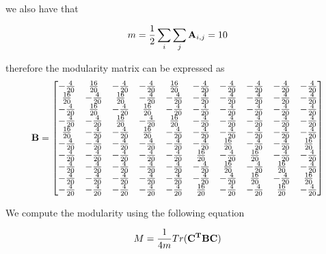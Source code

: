 \documentclass[a4paper,12pt]{article}
\begin{document}
	we also have that 
	
	\[ m = \frac{1}{2} \sum_i \sum_j {\bf A}_{i,j} = 10\]
	
	therefore the modularity matrix can be expressed as 
	\[ {\bf B} = \begin{bmatrix}
		-\frac{4}{20}& \frac{16}{20}& -\frac{4}{20}& -\frac{4}{20}& \frac{16}{20}& -\frac{4}{20}& -\frac{4}{20}& -\frac{4}{20}& -\frac{4}{20}& -\frac{4}{20}\\
		\frac{16}{20}& -\frac{4}{20}& \frac{16}{20}& -\frac{4}{20}& -\frac{4}{20}& -\frac{4}{20}& -\frac{4}{20}& -\frac{4}{20}& -\frac{4}{20}& -\frac{4}{20}\\
		-\frac{4}{20}& \frac{16}{20}& -\frac{4}{20}& \frac{16}{20}& -\frac{4}{20}& -\frac{4}{20}& -\frac{4}{20}& -\frac{4}{20}& -\frac{4}{20}& -\frac{4}{20}\\
		-\frac{4}{20}& -\frac{4}{20}& \frac{16}{20}& -\frac{4}{20}& \frac{16}{20}& -\frac{4}{20}& -\frac{4}{20}& -\frac{4}{20}& -\frac{4}{20}& -\frac{4}{20}\\
		\frac{16}{20}& -\frac{4}{20}& -\frac{4}{20}& \frac{16}{20}& -\frac{4}{20}& -\frac{4}{20}& -\frac{4}{20}& -\frac{4}{20}& -\frac{4}{20}& -\frac{4}{20}\\
		-\frac{4}{20}& -\frac{4}{20}& -\frac{4}{20}& -\frac{4}{20}& -\frac{4}{20}& -\frac{4}{20}& \frac{16}{20}& -\frac{4}{20}& -\frac{4}{20}& \frac{16}{20}\\
		-\frac{4}{20}& -\frac{4}{20}& -\frac{4}{20}& -\frac{4}{20}& -\frac{4}{20}& \frac{16}{20}& -\frac{4}{20}& \frac{16}{20}& -\frac{4}{20}& -\frac{4}{20}\\
		-\frac{4}{20}& -\frac{4}{20}& -\frac{4}{20}& -\frac{4}{20}& -\frac{4}{20}& -\frac{4}{20}& \frac{16}{20}& -\frac{4}{20}& \frac{16}{20}& -\frac{4}{20}\\
		-\frac{4}{20}& -\frac{4}{20}& -\frac{4}{20}& -\frac{4}{20}& -\frac{4}{20}& -\frac{4}{20}& -\frac{4}{20}& \frac{16}{20}& -\frac{4}{20}& \frac{16}{20}\\
		-\frac{4}{20}& -\frac{4}{20}& -\frac{4}{20}& -\frac{4}{20}& -\frac{4}{20}& \frac{16}{20}& -\frac{4}{20}& -\frac{4}{20}& \frac{16}{20}& -\frac{4}{20}
	\end{bmatrix} \]
	
	We compute the modularity using the following equation
	
	\[M = \frac{1}{4m}Tr({\bf C^T B C}) \]
	
\end{document}
